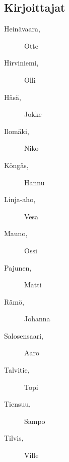 \subsection*{Kirjoittajat}
\begin{description}
\item[Heinävaara, ] Otte
\item[Hirviniemi, ] Olli
\item[Häsä, ] Jokke
\item[Ilomäki, ] Niko
\item[Köngäs, ] Hannu
\item[Linja-aho, ] Vesa
\item[Mauno, ] Ossi
\item[Pajunen, ] Matti
\item[Rämö, ] Johanna
\item[Salosensaari, ] Aaro
\item[Talvitie, ] Topi
\item[Tiensuu, ] Sampo
\item[Tilvis, ] Ville
\end{description}


